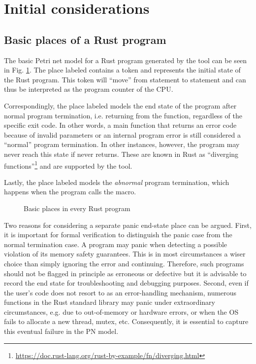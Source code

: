 \section{Initial considerations}

\subsection{Basic places of a Rust program}
\label{sec:basic-places}

The basic Petri net model for a Rust program generated by the tool
can be seen in Fig. \ref{fig:program-places}.
The place labeled  contains a token
and represents the initial state of the Rust program.
This token will ``move'' from statement to statement
and can thus be interpreted as the program counter of the \acrshort{CPU}.

Correspondingly, the place labeled  models
the end state of the program after normal program termination,
i.e. returning from the  function,
regardless of the specific exit code.
In other words, a main function that returns an error code because of invalid parameters
or an internal program error is still considered a ``normal'' program termination.
In other instances, however, the program may never reach this state
if  never returns.
These are known in Rust as ``diverging functions''\footnote{\url{https://doc.rust-lang.org/rust-by-example/fn/diverging.html}}
and are supported by the tool.

Lastly, the place labeled  models
the \emph{abnormal} program termination,
which happens when the program calls the  macro.

\begin{figure}[!htb]
  \centering
  
  \caption{Basic places in every Rust program}
  \label{fig:program-places}
\end{figure}

Two reasons for considering a separate panic end-state place can be argued.
First, it is important for formal verification to distinguish the panic case
from the normal termination case.
A program may panic when detecting a possible violation of its memory safety guarantees.
This is in most circumstances a wiser choice than simply ignoring the error and continuing.
Therefore, such programs should not be flagged in principle as erroneous or defective but
it is advisable to record the end state for troubleshooting and debugging purposes.
Second, even if the user's code does not resort to 
as an error-handling mechanism, numerous functions in the Rust standard library
may panic under extraordinary circumstances, e.g. due to out-of-memory or hardware errors,
or when the \acrshort{OS} fails to allocate a new thread, mutex, etc.
Consequently, it is essential to capture this eventual failure in the \acrshort{PN} model.

